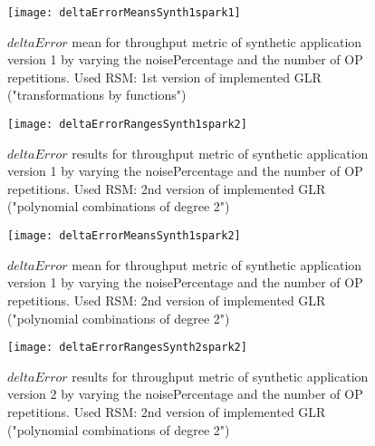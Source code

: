 \begin{figure}[htb]

    \centering
    
    \texttt{[image: deltaErrorMeansSynth1spark1]}
    
    \caption{$deltaError$ mean for throughput metric of synthetic application version 1 by varying the noisePercentage and the number of OP repetitions. Used RSM: 1st version of implemented GLR ("transformations by functions")}
    
    \label{fig::synth1spark1::means}
    
\end{figure}





\begin{figure}[htb]

    \centering
    
    \texttt{[image: deltaErrorRangesSynth1spark2]}
    
     \caption{$deltaError$ results for throughput metric of synthetic application version 1 by varying the noisePercentage and the number of OP repetitions. Used RSM: 2nd version of implemented GLR ("polynomial combinations of degree 2")}
    
    \label{fig::synth1spark2::intervals}
    
\end{figure}

\begin{figure}[htb]

    \centering
    
    \texttt{[image: deltaErrorMeansSynth1spark2]}
    
    \caption{$deltaError$ mean for throughput metric of synthetic application version 1 by varying the noisePercentage and the number of OP repetitions. Used RSM: 2nd version of implemented GLR ("polynomial combinations of degree 2")}
    
    \label{fig::synth1spark2::means}
    
\end{figure}





\begin{figure}[htb]

    \centering
    
    \texttt{[image: deltaErrorRangesSynth2spark2]}
    
     \caption{$deltaError$ results for throughput metric of synthetic application version 2 by varying the noisePercentage and the number of OP repetitions. Used RSM: 2nd version of implemented GLR ("polynomial combinations of degree 2")}
    
    \label{fig::synth2spark2::intervals}
    
\end{figure}

